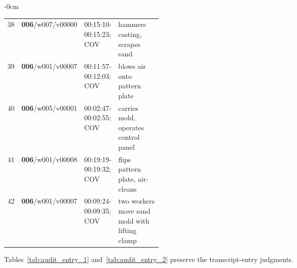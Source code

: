 \begin{table}[!t]
\begin{adjustwidth}{-\extralength}{0cm}
\begin{tabularx}{\linewidth}{@{}r p{0.16\linewidth} p{0.20\linewidth} L@{}}
38 & \textbf{006}/w007/v00000 & 00:15:10-00:15:23; COV & hammers casting, scrapes sand \\
39 & \textbf{006}/w001/v00007 & 00:11:57-00:12:03; COV & blows air onto pattern plate \\
40 & \textbf{006}/w005/v00001 & 00:02:47-00:02:55; COV & carries mold, operates control panel \\
41 & \textbf{006}/w001/v00008 & 00:19:19-00:19:32; COV & flips pattern plate, air-cleans \\
42 & \textbf{006}/w001/v00007 & 00:09:24-00:09:35; COV & two workers move sand mold with lifting clamp \\
\bottomrule\end{tabularx}\end{adjustwidth}\end{table}
\FloatBarrier
Tables~\ref{tab:audit_entry_1} and~\ref{tab:audit_entry_2} preserve the transcript-entry judgments.
